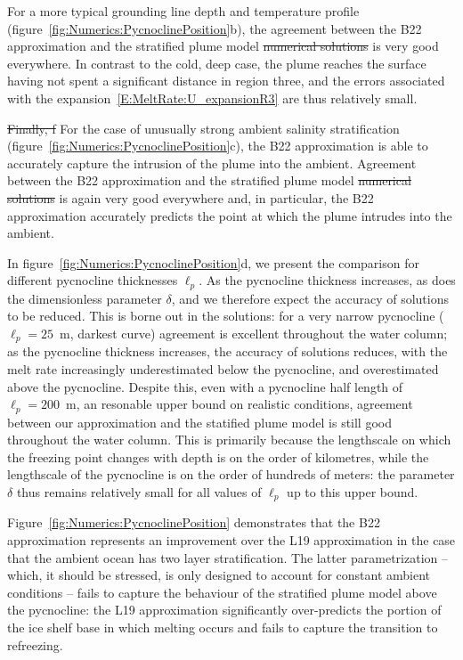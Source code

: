 \documentclass[openacc]{rsproca_new}%
\newcommand{\red}[1]{{\color{red} #1}}
\newcommand{\blue}[1]{{\color{blue} #1}}
\newcommand{\rout}[1]{\red{\st{#1}}}\newcommand{\ab}[1]{\textcolor{Green}{#1}}\newcommand{\about}[1]{\textcolor{Cyan}{\sout{#1}}}
\newcommand{\lt}{\delta} %
\begin{document}
For a more typical grounding line depth and temperature profile (figure~\ref{fig:Numerics:PycnoclinePosition}b), the agreement between the B22 approximation and \blue{the stratified plume model}\rout{numerical solutions} is very good everywhere. In contrast to the cold, deep case, the plume reaches the surface having not spent a significant distance in region three, and the errors associated with the expansion~\eqref{E:MeltRate:U_expansionR3} are thus relatively small.

\rout{Finally, f}\blue{F}or the case of unusually strong ambient salinity stratification (figure~\ref{fig:Numerics:PycnoclinePosition}c), the B22 approximation is able to accurately capture the intrusion of the  plume into the ambient. Agreement between the B22 approximation and \blue{the stratified plume model}\rout{numerical solutions} is again very good everywhere and, in particular, the B22 approximation accurately predicts the point at which the plume intrudes into the ambient.

\blue{In figure~\ref{fig:Numerics:PycnoclinePosition}d, we present the comparison for different pycnocline thicknesses $\ell_p$. As the pycnocline thickness increases, as does the dimensionless parameter $\delta$, and we therefore expect the accuracy of solutions to be reduced. This is borne out in the solutions: for a very narrow pycnocline ($\ell_p = 25$~m, darkest curve) agreement is excellent throughout the water column; as the pycnocline thickness increases, the accuracy of solutions reduces, with the melt rate increasingly underestimated below the pycnocline, and overestimated above the pycnocline. Despite this, even with a pycnocline half length of $\ell_p = 200$~m, an resonable upper bound on realistic conditions, agreement between our approximation and the statified plume model is still good throughout the water column. This is primarily because the lengthscale on which the freezing point changes with depth is on the order of kilometres, while the lengthscale of the pycnocline is on the order of hundreds of meters: the parameter $\lt$ thus remains relatively small for all values of $\ell_p$ up to this upper bound.}

Figure~\ref{fig:Numerics:PycnoclinePosition} demonstrates that the B22 approximation represents an improvement over the L19 approximation in the case that the ambient ocean has two layer stratification. The latter parametrization -- which, it should be stressed, is only designed to account for constant ambient conditions -- fails to capture the behaviour \blue{of the stratified plume model} above the pycnocline: the L19 approximation significantly over-predicts the portion of the ice shelf base in which melting occurs and fails to capture the transition to refreezing.
\end{document}
